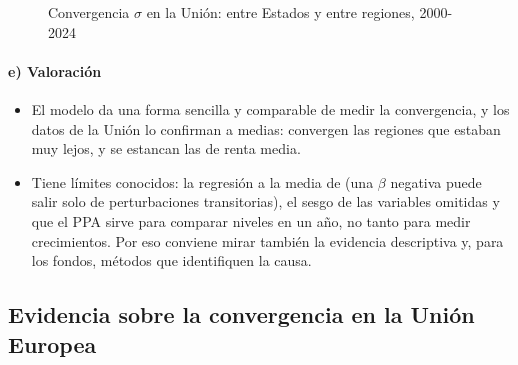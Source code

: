 \documentclass[11pt]{article}
\begin{document}
\begin{figure}[H]
\centering
\caption{Convergencia $\sigma$ en la Unión: entre Estados y entre regiones, 2000-2024}\label{fig:sigma}
\end{figure}

\paragraph{e) Valoración}

\begin{itemize}
\item El modelo da una forma sencilla y comparable de medir la convergencia, y los datos de la Unión lo confirman a medias: convergen las regiones que estaban muy lejos, y se estancan las de renta media.
\item Tiene límites conocidos: la regresión a la media de  (una $\beta$ negativa puede salir solo de perturbaciones transitorias), el sesgo de las variables omitidas y que el PPA sirve para comparar niveles en un año, no tanto para medir crecimientos. Por eso conviene mirar también la evidencia descriptiva y, para los fondos, métodos que identifiquen la causa.
\end{itemize}

\subsection{Evidencia sobre la convergencia en la Unión Europea}\label{sec:evidencia}
\end{document}
